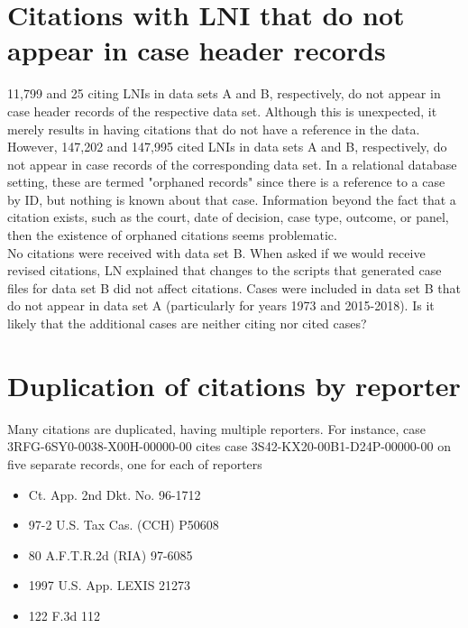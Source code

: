 \documentclass[10pt, letterpaper]{article}
\begin{document}
\begin{spacing}{1.0}

\clearpage

\section{Citations with LNI that do not appear in case header records}

11,799 and 25 citing LNIs in data sets A and B, respectively, do not appear in case header records of the respective data set.  Although this is unexpected, it merely results in having citations that do not have a reference in the data.  However, 147,202 and 147,995 cited LNIs in data sets A and B, respectively, do not appear in case records of the corresponding data set.  In a relational database setting, these are termed "orphaned records" since there is a reference to a case by ID, but nothing is known about that case.  Information beyond the fact that a citation exists, such as the court, date of decision, case type, outcome, or panel, then the existence of orphaned citations seems problematic.\\

No citations were received with data set B.  When asked if we would receive revised citations, LN explained that changes to the scripts that generated case files for data set B did not affect citations.  Cases were included in data set B that do not appear in data set A (particularly for years 1973 and 2015-2018).  Is it likely that the additional cases are neither citing nor cited cases?


\clearpage

\section{Duplication of citations by reporter} 

Many citations are duplicated, having multiple reporters.  For instance, case 3RFG-6SY0-0038-X00H-00000-00 cites case 3S42-KX20-00B1-D24P-00000-00 on five separate records, one for each of reporters

\begin{itemize}\setlength\itemsep{1pt}
    \item Ct. App. 2nd Dkt. No. 96-1712
    \item 97-2 U.S. Tax Cas. (CCH) P50608
    \item 80 A.F.T.R.2d (RIA) 97-6085
    \item 1997 U.S. App. LEXIS 21273
    \item 122 F.3d 112
\end{itemize}


\end{spacing}
\end{document}

